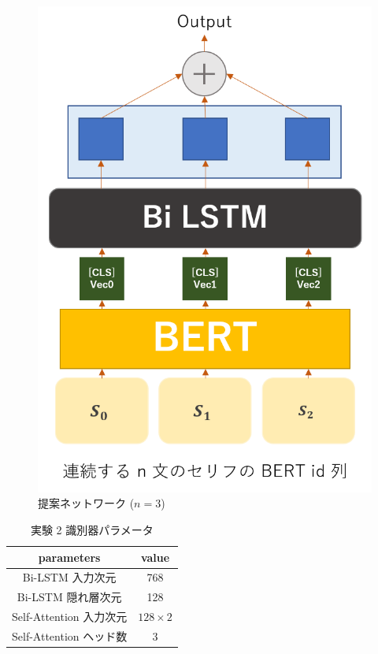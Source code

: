 \documentclass[twocolumn]{jarticle}     %
\begin{document}
\begin{figure}[!htb]
  \begin{center}
    \includegraphics[scale=0.30]{seq_net.png}
    \caption{提案ネットワーク ($n = 3$)} %
    \label{fig:net} %
  \end{center}
\end{figure}

\begin{table}[bht]
\begin{center}
\caption{実験 2 識別器パラメータ}
\begin{tabular}{|c|c|}
\hline
parameters & value \\ \hline
Bi-LSTM 入力次元 & 768   \\ \hline
Bi-LSTM 隠れ層次元  & 128    \\ \hline
Self-Attention 入力次元 & $128 \times 2$   \\ \hline
Self-Attention ヘッド数 & 3     \\ \hline
\end{tabular}
\label{tab:self_net}
\end{center}
\end{table}
\end{document}
